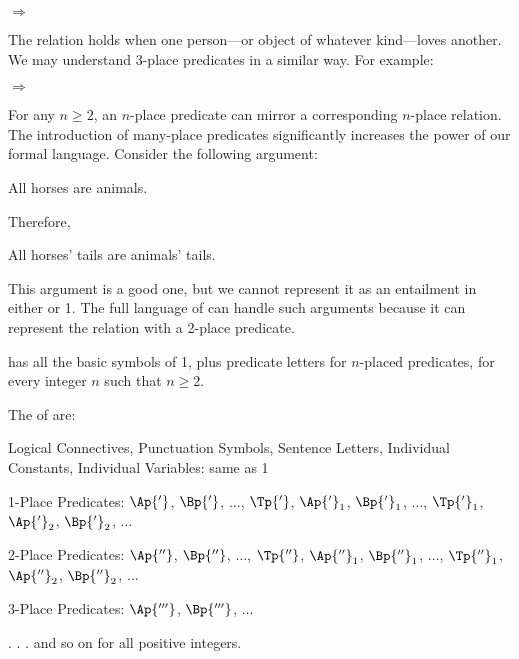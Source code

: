 \begin{menumerate}
		\item {} $\Rightarrow$ 
\end{menumerate}

\noindent{}The  relation holds when one person---or object of whatever kind---loves another.  We may understand 3-place predicates in a similar way.  For example:

\begin{menumerate}
	\item {} $\Rightarrow$ 
\end{menumerate}

For any $n\geq2$, an $n$-place predicate can mirror a corresponding $n$-place relation. 
The introduction of many-place predicates significantly increases the power of our formal language. 
Consider the following argument:

\begin{menumerate}
\item All horses are animals.

Therefore,

\item All horses' tails are animals' tails.
\end{menumerate}

\noindent{}This argument is a good one, but we cannot represent it as an entailment in either \GSL{} or \GQL{}1. 
The full language of \GQL{} can handle such arguments because it can represent the  relation with a 2-place predicate. 

\GQL{} has all the basic symbols of \GQL{}1, plus predicate letters for $n$-placed predicates, for every integer $n$ such that $n\geq2$. 
\begin{majorILnc}{}
The  of \GQL{} are:
\begin{cenumerate}
\item Logical Connectives, Punctuation Symbols, Sentence Letters, Individual Constants, Individual Variables: same as \GQL{}1
\item 1-Place Predicates: $\Ap{'}$, $\Bp{'}$, $\ldots$, $\Tp{'}$, $\Ap{'}_1$, $\Bp{'}_1$, $\ldots$, $\Tp{'}_1$, $\Ap{'}_2$, $\Bp{'}_2$, $\ldots$
\item 2-Place Predicates: $\Ap{''}$, $\Bp{''}$, $\ldots$, $\Tp{''}$, $\Ap{''}_1$, $\Bp{''}_1$, $\ldots$, $\Tp{''}_1$, $\Ap{''}_2$, $\Bp{''}_2$, $\ldots$
\item 3-Place Predicates: $\Ap{'''}$, $\Bp{'''}$, $\ldots$
\item[] \hspace{.5in} . . . and so on for all positive integers.
\end{cenumerate}
\end{majorILnc}

